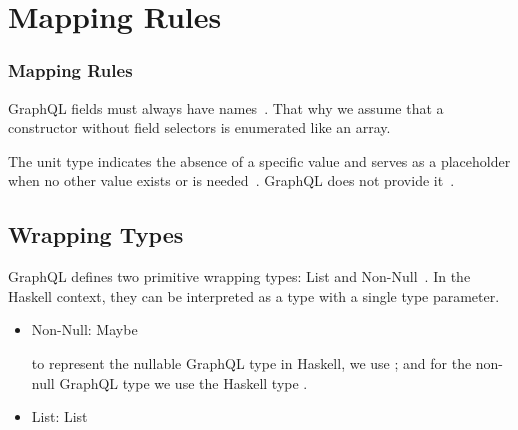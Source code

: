 


\section{Mapping Rules}

\begin{frame}\frametitle{Mapping Rules}

\footnotesize
\begin{itemize}

   GraphQL fields must always have names~\cite{gql-spec}. 
  That why we assume that a constructor without field selectors is enumerated like an array.
  

   The unit type indicates the absence of a specific value and serves as a placeholder when no other value exists or is needed~\cite{fsharp-unit}. GraphQL does not provide it~\cite{gql-spec}. 


\end{itemize}
\end{frame}

\subsection{Wrapping Types}
\begin{frame}

GraphQL defines two primitive wrapping types: List and Non-Null~\cite{gql-spec}. In the Haskell context, they can be interpreted as a type with a single type parameter.
\begin{itemize}

  \item Non-Null: Maybe

    to represent the nullable GraphQL type  in Haskell, we use ; and for the non-null GraphQL type  we use the Haskell type .

  \item List: List
\end{itemize}

\end{frame}

